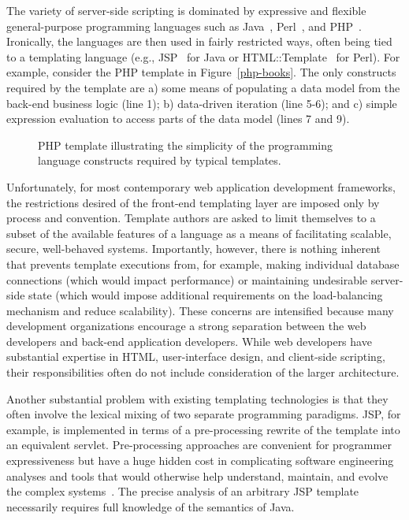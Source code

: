\documentclass{www2003-submission}
\newcommand{\figref}[1]{Figure~\ref{#1}}
\begin{document}
The variety of server-side scripting is dominated by expressive and
flexible general-purpose programming languages such as
Java~\cite{Java}, Perl~\cite{Perl}, and PHP~\cite{PHP}.  Ironically,
the languages are then used in fairly restricted ways, often being
tied to a templating language (e.g., JSP~\cite{JSP} for Java or
HTML::Template~\cite{HTML-Template} for Perl).  For example, consider
the PHP template in \figref{php-books}.  The only constructs required
by the template are a) some means of populating a data model from the
back-end business logic (line 1); b) data-driven iteration (line
5-6); and c) simple expression evaluation to access parts of the data
model (lines 7 and 9). %

\begin{figure}[htbp]
\caption{PHP template illustrating the simplicity of the programming
language constructs required by typical templates.
\label{fig-php-template}}
\end{figure}

Unfortunately, for most contemporary web application development
frameworks, the restrictions desired of the front-end templating layer
are imposed only by process and convention.  Template authors are
asked to limit themselves to a subset of the available features of a
language as a means of facilitating scalable, secure, well-behaved
systems.  Importantly, however, there is nothing inherent that
prevents template executions from, for example, making individual
database connections (which would impact performance) or maintaining
undesirable server-side state (which would impose additional
requirements on the load-balancing mechanism and reduce scalability).
These concerns are intensified because many development organizations
encourage a strong separation between the web developers and back-end
application developers. While web developers have substantial
expertise in HTML, user-interface design, and client-side scripting,
their responsibilities often do not include consideration of the
larger architecture.

Another substantial problem with existing templating technologies is
that they often involve the lexical mixing of two separate programming
paradigms.  JSP, for example, is implemented in terms of a
pre-processing rewrite of the template into an equivalent servlet.
Pre-processing approaches are convenient for programmer expressiveness
but have a huge hidden cost in complicating software engineering
analyses and tools that would otherwise help understand, maintain, and
evolve the complex systems~\cite{PCP3,EvilMacros,StroustropDnEChapterAboutCpp}.
The precise analysis of an arbitrary JSP template necessarily requires
full knowledge of the semantics of Java.
\end{document}

